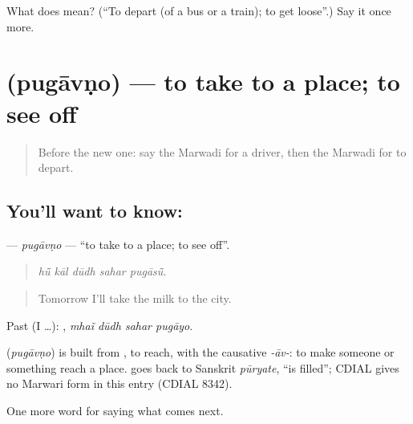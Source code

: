 \begin{tcolorbox}[breakable,colback=teal!4,colframe=teal!35!black,title={Before you move on}]
What does  mean? (\textquotedblleft{}To depart (of a bus or a train); to get loose\textquotedblright{}.) Say it once more.
\end{tcolorbox}
\section[\texorpdfstring{\mw{पुगावणो} (pugāvṇo)}{पुगावणो (pugāvṇo)}]{ (pugāvṇo) — to take to a place; to see off}

\label{lesson:MW-C218-pugavno}



\begin{quote}
Before the new one: say the Marwadi for a driver, then the Marwadi for to depart.
\end{quote}

\subsection*{You'll want to know: }
\textbf{} — \emph{pugāvṇo} — \textquotedblleft{}to take to a place; to see off\textquotedblright{}.

\begin{quote}
    
\end{quote}

\begin{quote}
\emph{hū̃ kāl dūdh sahar pugāsū̃.}
\end{quote}

\begin{quote}
Tomorrow I'll take the milk to the city.
\end{quote}

Past (I …):    , \emph{mhaĩ dūdh sahar pugāyo}.

\begin{cousinweb}
\textbf{} (\emph{pugāvṇo}) is built from \textbf{}, to reach, with the causative \emph{-āv-}: to make someone or something reach a place. \textbf{} goes back to Sanskrit \emph{pūryate}, \textquotedblleft{}is filled\textquotedblright{}; CDIAL gives no Marwari form in this entry (CDIAL 8342).
\end{cousinweb}

\begin{grammarlens}[title={What you've built}]
One more word for saying what comes next.
\end{grammarlens}

